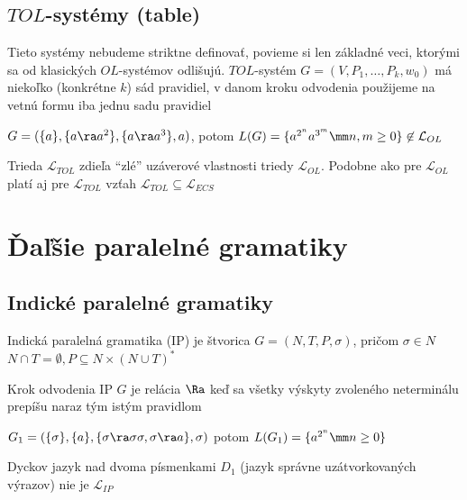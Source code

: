 \subsection{$TOL$-systémy (table)}

Tieto systémy nebudeme striktne definovať, povieme si len základné
veci, ktorými sa od kla\-sic\-kých $OL$-systémov odlišujú.
$TOL$-systém $G=(V,P_{1},\dots,P_{k},w_{0})$ má niekoľko
(konkrétne $k$) sád pravidiel, v danom kroku odvodenia použijeme
na vetnú formu iba jednu sadu pravidiel

\begin{priklad}
$G=(\{a\},\{a\ra a^{2}\},\{a\ra a^{3}\},a)$, potom
$L(G)=\{a^{2^{n}}a^{3^{m}}\mm n,m\geq0\}\not\in\mathcal{L}_{OL}$
\end{priklad}

\begin{poznamka}
Trieda $\mathcal{L}_{TOL}$ zdieľa ``zlé'' uzáverové vlastnosti
triedy $\mathcal{L}_{OL}$. Podobne ako pre $\mathcal{L}_{OL}$
platí aj pre $\mathcal{L}_{TOL}$ vzťah
$\mathcal{L}_{TOL}\subseteq\mathcal{L}_{ECS}$
\end{poznamka}

\section{Ďaľšie paralelné gramatiky}

\subsection{Indické paralelné gramatiky}

\begin{definicia}
Indická paralelná gramatika (IP) je štvorica $G=(N,T,P,\sigma)$,
pričom \mbox{$\sigma\in N$} $N\cap T=\emptyset, P\subseteq
N\times(N\cup T)^{*}$
\end{definicia}

\begin{definicia}
Krok odvodenia IP $G$ je relácia $\Ra$ keď sa všetky výskyty
zvoleného neterminálu prepíšu naraz tým istým pravidlom
\end{definicia}

\begin{priklad}
$G_{1}=(\{\sigma\},\{a\},\{\sigma\ra\sigma\sigma,\sigma\ra
a\},\sigma)$ potom $L(G_{1})=\{a^{2^{n}}\mm n\geq0\}$
\end{priklad}

\begin{priklad}
Dyckov jazyk nad dvoma písmenkami $D_{1}$ (jazyk správne
uzátvorkovaných výrazov) nie je $\mathcal{L}_{IP}$
\end{priklad}

